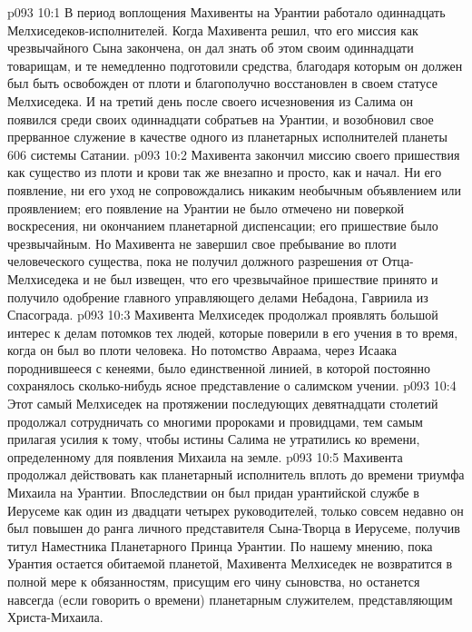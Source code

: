 \vs p093 10:1 В период воплощения Махивенты на Урантии работало одиннадцать Мелхиседеков\hyp{}исполнителей. Когда Махивента решил, что его миссия как чрезвычайного Сына закончена, он дал знать об этом своим одиннадцати товарищам, и те немедленно подготовили средства, благодаря которым он должен был быть освобожден от плоти и благополучно восстановлен в своем статусе Мелхиседека. И на третий день после своего исчезновения из Салима он появился среди своих одиннадцати собратьев на Урантии, и возобновил свое прерванное служение в качестве одного из планетарных исполнителей планеты 606 системы Сатании.
\vs p093 10:2 Махивента закончил миссию своего пришествия как существо из плоти и крови так же внезапно и просто, как и начал. Ни его появление, ни его уход не сопровождались никаким необычным объявлением или проявлением; его появление на Урантии не было отмечено ни поверкой воскресения, ни окончанием планетарной диспенсации; его пришествие было чрезвычайным. Но Махивента не завершил свое пребывание во плоти человеческого существа, пока не получил должного разрешения от Отца\hyp{}Мелхиседека и не был извещен, что его чрезвычайное пришествие принято и получило одобрение главного управляющего делами Небадона, Гавриила из Спасограда.
\vs p093 10:3 \pc Махивента Мелхиседек продолжал проявлять большой интерес к делам потомков тех людей, которые поверили в его учения в то время, когда он был во плоти человека. Но потомство Авраама, через Исаака породнившееся с кенеями, было единственной линией, в которой постоянно сохранялось сколько\hyp{}нибудь ясное представление о салимском учении.
\vs p093 10:4 Этот самый Мелхиседек на протяжении последующих девятнадцати столетий продолжал сотрудничать со многими пророками и провидцами, тем самым прилагая усилия к тому, чтобы истины Салима не утратились ко времени, определенному для появления Михаила на земле.
\vs p093 10:5 Махивента продолжал действовать как планетарный исполнитель вплоть до времени триумфа Михаила на Урантии. Впоследствии он был придан урантийской службе в Иерусеме как один из двадцати четырех руководителей, только совсем недавно он был повышен до ранга личного представителя Сына\hyp{}Творца в Иерусеме, получив титул Наместника Планетарного Принца Урантии. По нашему мнению, пока Урантия остается обитаемой планетой, Махивента Мелхиседек не возвратится в полной мере к обязанностям, присущим его чину сыновства, но останется навсегда (если говорить о времени) планетарным служителем, представляющим Христа\hyp{}Михаила.
